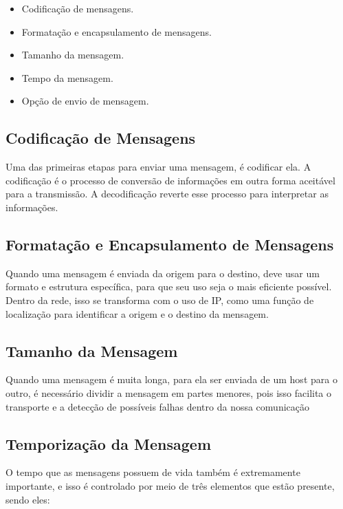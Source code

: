 \documentclass[12pt a4paper]{paper}
\begin{document}
\begin{itemize}
  \item Codificação de mensagens.
  \item Formatação e encapsulamento de mensagens. 
  \item Tamanho da mensagem. 
  \item Tempo da mensagem. 
  \item Opção de envio de mensagem.
\end{itemize}

\subsection{Codificação de Mensagens} %
\label{sub:Codificação de Mensagens}
Uma das primeiras etapas para enviar uma mensagem, é codificar ela. A codificação é o 
processo de conversão de informações em outra forma aceitável para a transmissão. A 
decodificação reverte esse processo para interpretar as informações.

\subsection{Formatação e Encapsulamento de Mensagens} %
\label{sub:Formatação e Encapsulamento de Mensagens}
Quando uma mensagem é enviada da origem para o destino, deve usar um formato e 
estrutura específica, para que seu uso seja o mais eficiente possível. Dentro da rede, 
isso se transforma com o uso de IP, como uma função de localização para identificar a 
origem e o destino da mensagem.

\subsection{Tamanho da Mensagem} %
\label{sub:Tamanho da Mensagem}
Quando uma mensagem é muita longa, para ela ser enviada de um host para o outro, é 
necessário dividir a mensagem em partes menores, pois isso facilita o transporte e a 
detecção de possíveis falhas dentro da nossa comunicação





\subsection{Temporização da Mensagem} %
\label{sub:Temporização da Mensagem}
O tempo que as mensagens possuem de vida também é extremamente importante, e isso é 
controlado por meio de três elementos que estão presente, sendo eles: 
\end{document}
